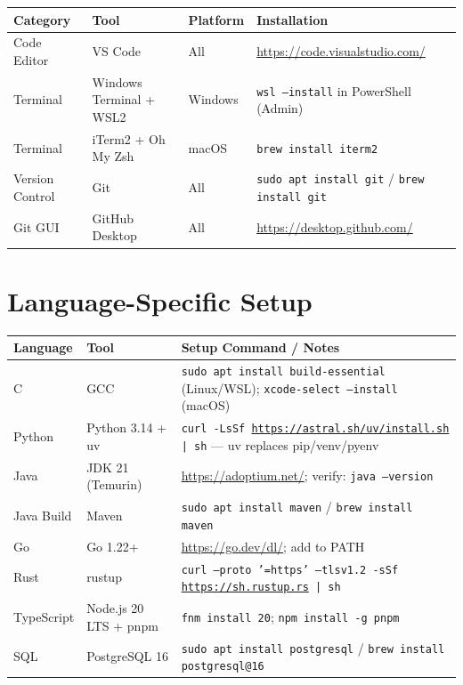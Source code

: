 \documentclass[11pt, a4paper, oneside]{report}
\begin{document}
{{{\small
\begin{longtable}{L{0.15\textwidth} L{0.22\textwidth} L{0.15\textwidth} L{0.32\textwidth}}
\toprule
\textbf{Category} & \textbf{Tool} & \textbf{Platform} & \textbf{Installation} \\
\midrule
\endfirsthead
\bottomrule
\endlastfoot
Code Editor & VS Code & All & \url{https://code.visualstudio.com/} \\
Terminal & Windows Terminal + WSL2 & Windows & \texttt{wsl --install} in PowerShell (Admin) \\
Terminal & iTerm2 + Oh My Zsh & macOS & \texttt{brew install iterm2} \\
Version Control & Git & All & \texttt{sudo apt install git} / \texttt{brew install git} \\
Git GUI & GitHub Desktop & All & \url{https://desktop.github.com/} \\
\end{longtable}

\section[Language Setup]{Language-Specific Setup}

{\small
{}
\begin{longtable}{L{0.12\textwidth} L{0.22\textwidth} L{0.56\textwidth}}
\toprule
\textbf{Language} & \textbf{Tool} & \textbf{Setup Command / Notes} \\
\midrule
\endfirsthead
\bottomrule
\endlastfoot
C & GCC & \texttt{sudo apt install build-essential} (Linux/WSL); \texttt{xcode-select --install} (macOS) \\
Python & Python 3.14 + uv & \texttt{curl -LsSf \url{https://astral.sh/uv/install.sh} | sh} --- uv replaces pip/venv/pyenv \\
Java & JDK 21 (Temurin) & \url{https://adoptium.net/}; verify: \texttt{java --version} \\
Java Build & Maven & \texttt{sudo apt install maven} / \texttt{brew install maven} \\
Go & Go 1.22+ & \url{https://go.dev/dl/}; add to PATH \\
Rust & rustup & \texttt{curl --proto '=https' --tlsv1.2 -sSf \url{https://sh.rustup.rs} | sh} \\
TypeScript & Node.js 20 LTS + pnpm & \texttt{fnm install 20}; \texttt{npm install -g pnpm} \\
SQL & PostgreSQL 16 & \texttt{sudo apt install postgresql} / \texttt{brew install postgresql@16} \\
\end{longtable}

}}}}
\end{document}
